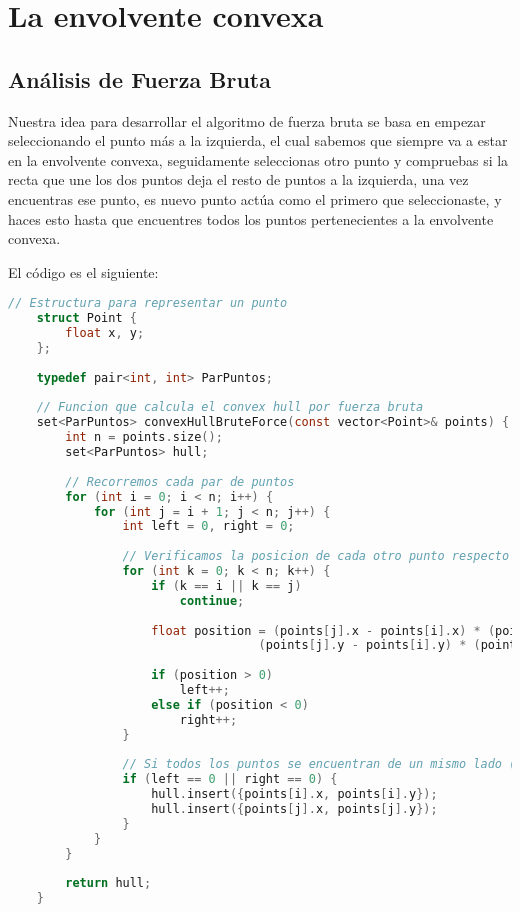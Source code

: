 \documentclass[a4paper,12pt]{article}
\begin{document}
\section{La envolvente convexa}
\subsection{Análisis de Fuerza Bruta}

Nuestra idea para desarrollar el algoritmo de fuerza bruta se basa en empezar seleccionando el punto más a la izquierda, 
el cual sabemos que siempre va a estar en la envolvente convexa, seguidamente seleccionas otro punto y compruebas si 
la recta que une los dos puntos deja el resto de puntos a la izquierda, una vez encuentras ese punto, es nuevo punto 
actúa como el primero que seleccionaste, y haces esto hasta que encuentres todos los puntos pertenecientes a la envolvente convexa.

El código es el siguiente:

\begin{lstlisting}[language=C, caption={Brute Force de \textbf{"La envolvente convexa"}}]
	// Estructura para representar un punto
	struct Point {
		float x, y;
	};
	
	typedef pair<int, int> ParPuntos;
	
	// Funcion que calcula el convex hull por fuerza bruta
	set<ParPuntos> convexHullBruteForce(const vector<Point>& points) {
		int n = points.size();
		set<ParPuntos> hull;
		
		// Recorremos cada par de puntos
		for (int i = 0; i < n; i++) {
			for (int j = i + 1; j < n; j++) {
				int left = 0, right = 0;
				
				// Verificamos la posicion de cada otro punto respecto a la linea formada por points[i] y points[j]
				for (int k = 0; k < n; k++) {
					if (k == i || k == j)
						continue;
						
					float position = (points[j].x - points[i].x) * (points[k].y - points[i].y) -
								   (points[j].y - points[i].y) * (points[k].x - points[i].x);
					
					if (position > 0)
						left++;
					else if (position < 0)
						right++;
				}
				
				// Si todos los puntos se encuentran de un mismo lado (o son colineales), se adjuntan los puntos de la arista
				if (left == 0 || right == 0) {
					hull.insert({points[i].x, points[i].y});
					hull.insert({points[j].x, points[j].y});
				}
			}
		}
		
		return hull;
	}
\end{lstlisting}
\end{document}
